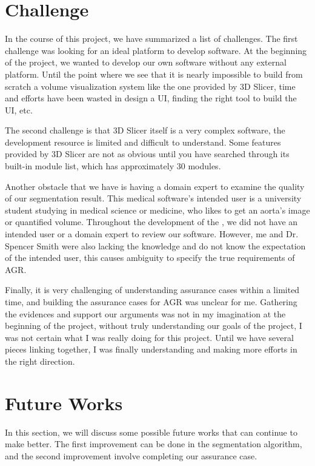 \section{Challenge}\label{challenge}
In the course of this project, we have summarized a list of challenges. The first challenge was looking for an ideal platform to develop \progname{} software. At the beginning of the project, we wanted to develop our own software without any external platform. Until the point where we see that it is nearly impossible to build from scratch a volume visualization system like the one provided by 3D Slicer, time and efforts have been wasted in design a UI, finding the right tool to build the UI, etc. 

The second challenge is that 3D Slicer itself is a very complex software, the development resource is limited and difficult to understand. Some features provided by 3D Slicer are not as obvious until you have searched through its built-in module list, which has approximately 30 modules.

Another obstacle that we have is having a domain expert to examine the quality of our segmentation result. This medical software's intended user is a university student studying in medical science or medicine, who likes to get an aorta's image or quantified volume. Throughout the development of the \progname{}, we did not have an intended user or a domain expert to review our software. However, me and Dr. Spencer Smith were also lacking the knowledge and do not know the expectation of the intended user, this causes ambiguity to specify the true requirements of AGR.

Finally, it is very challenging of understanding assurance cases within a limited time, and building the assurance cases for AGR was unclear for me. Gathering the evidences and support our arguments was not in my imagination at the beginning of the project, without truly understanding our goals of the project, I was not certain what I was really doing for this project. Until we have several pieces linking together, I was finally understanding and making more efforts in the right direction. 

\section{Future Works}\label{fw}

In this section, we will discuss some possible future works that can continue to make \progname{} better. The first improvement can be done in the segmentation algorithm, and the second improvement involve completing our assurance case.

